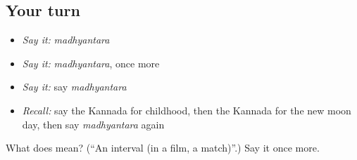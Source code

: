 \subsection*{Your turn}
\begin{itemize}
\raggedright
  \item \emph{Say it:} \emph{madhyantara}
  \item \emph{Say it:} \emph{madhyantara}, once more
  \item \emph{Say it:} say \emph{madhyantara}
  \item \emph{Recall:} say the Kannada for childhood, then the Kannada for the new moon day, then say \emph{madhyantara} again
\end{itemize}

\begin{tcolorbox}[breakable,colback=teal!4,colframe=teal!35!black,title={Before you move on}]
What does  mean? (\textquotedblleft{}An interval (in a film, a match)\textquotedblright{}.) Say it once more.
\end{tcolorbox}
